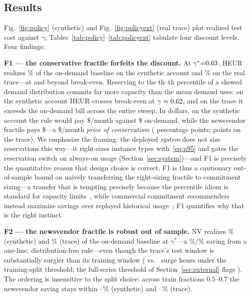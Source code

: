 \documentclass[10pt,journal]{IEEEtran}
\begin{document}
\subsection{Results}
Fig.~\ref{fig:policy} (synthetic) and Fig.~\ref{fig:policyext} (real trace)
plot realized test cost against $\gamma$;
Tables~\ref{tab:policy}--\ref{tab:policyext} tabulate four discount levels.
Four findings:

\textbf{F1 --- the conservative fractile forfeits the discount.} At
$\gamma^{*}{=}0.63$, HEUR realizes \polPctHeur\% of the on-demand
baseline on the synthetic account and \extPolPctHeur\% on the real
trace---at and beyond break-even. Reserving to the
\polImpliedQ th--\extPolImpliedQ th percentile of a skewed demand
distribution commits far more capacity than the mean demand uses: on the
synthetic account HEUR crosses break-even at
$\gamma\approx0.62$, and on the trace it exceeds the on-demand
bill across the entire sweep. In
dollars, on the synthetic account the rule would pay
\$\polHeurMonthly/month against \$\polOdMonthly{} on-demand, while the
newsvendor fractile pays \$\polNvMonthly---a \$\polPoCMonthly/month
\emph{price of conservatism} (\polPoC{} percentage points; \extPolPoC{}
points on the trace). We emphasize the framing: the deployed \emph{system}
does not size reservations this way---it right-sizes instance types
with~\eqref{eq:p95} and gates the reservation switch on always-on usage
(Section~\ref{sec:system})---and F1 is precisely the quantitative reason
that design choice is correct. F1 is thus a cautionary out-of-sample bound
on naively transferring the right-sizing fractile to commitment sizing---a
transfer that is tempting precisely because the percentile idiom is
standard for capacity limits~\cite{rzadca2020autopilot,cortez2017resource},
while commercial commitment recommenders instead maximize savings over
replayed historical usage~\cite{awsri2026,awssp2026,azureres2026}; F1
quantifies why that is the right instinct.

\textbf{F2 --- the newsvendor fractile is robust out of sample.} NV
realizes \polPctNv\% (synthetic) and \extPolPctNv\% (trace) of the
on-demand baseline at $\gamma^{*}$---a \polNvSave\%/\extPolNvSave\% saving
from a one-line, distribution-free rule---even though the trace's test
window is substantially surgier than its training window
(\extPolSurgeTest{} vs.\ \extPolSurgeTrain{} surge hours under the
training-split threshold; the full-series threshold of
Section~\ref{sec:external} flags \extRndSurges). The ordering is
insensitive to the split choice: across train fractions $0.5$--$0.7$ the
newsvendor saving stays within \polNvSaveMin--\polNvSaveMax\% (synthetic)
and \extPolNvSaveMin--\extPolNvSaveMax\% (trace).
\end{document}
